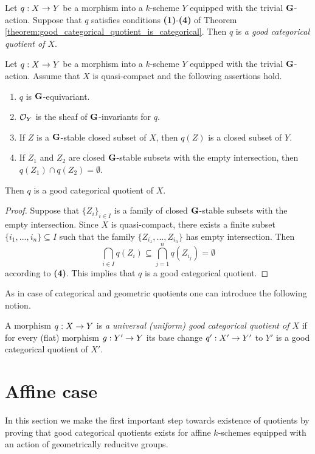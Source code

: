 \begin{definition}
Let $q:X\rightarrow Y$ be a morphism into a $k$-scheme $Y$ equipped with the trivial $\mathbf{G}$-action. Suppose that $q$ satisfies conditions \textbf{(1)}-\textbf{(4)} of Theorem \ref{theorem:good_categorical_quotient_is_categorical}. Then $q$ is \textit{a good categorical quotient of $X$}.
\end{definition}

\begin{proposition}\label{proposition:finite_intersection_property_for_quasi_compact_suffices_for_good_categorical_quotients}
Let $q:X\rightarrow Y$ be a morphism into a $k$-scheme $Y$ equipped with the trivial $\mathbf{G}$-action. Assume that $X$ is quasi-compact and the following assertions hold.
\begin{enumerate}[label=\emph{\textbf{(\arabic*)}}, leftmargin=3.0em]
\item $q$ is $\mathbf{G}$-equivariant.
\item ${\mathcal O}_Y$ is the sheaf of $\mathbf{G}$-invariants for $q$.
\item If $Z$ is a $\mathbf{G}$-stable closed subset of $X$, then $q(Z)$ is a closed subset of $Y$.
\item If $Z_1$ and $Z_2$ are closed $\mathbf{G}$-stable subsets with the empty intersection, then $q(Z_1)\cap q(Z_2) = \emptyset$. 
\end{enumerate}
Then $q$ is a good categorical quotient of $X$.
\end{proposition}
\begin{proof}
Suppose that $\{Z_i\}_{i\in I}$ is a family of closed $\mathbf{G}$-stable subsets with the empty intersection. Since $X$ is quasi-compact, there exists a finite subset $\{i_1,...,i_n\}\subseteq I$ such that the family $\{Z_{i_1},...,Z_{i_n}\}$ has empty intersection. Then
$$\bigcap_{i\in I}q(Z_i)\subseteq \bigcap_{j=1}^nq(Z_{i_j}) = \emptyset$$
according to \textbf{(4)}. This implies that $q$ is a good categorical quotient.
\end{proof}
\noindent
As in case of categorical and geometric quotients one can introduce the following notion.

\begin{definition}
A morphism $q:X\rightarrow Y$ is \textit{a universal (uniform) good categorical quotient of $X$} if for every (flat) morphism $g:Y'\rightarrow Y$ its base change $q':X'\rightarrow Y'$ to $Y'$ is a good categorical quotient of $X'$. 
\end{definition}

\section{Affine case}
\noindent
In this section we make the first important step towards existence of quotients by proving that good categorical quotients exists for affine $k$-schemes equipped with an action of geometrically reducitve groups. 

